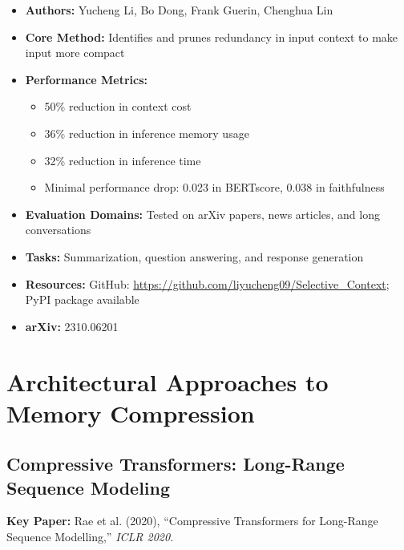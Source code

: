 \documentclass[11pt]{article}
\begin{document}
\begin{itemize}[leftmargin=*]
    \item \textbf{Authors:} Yucheng Li, Bo Dong, Frank Guerin, Chenghua Lin
    \item \textbf{Core Method:} Identifies and prunes redundancy in input context to make input more compact
    \item \textbf{Performance Metrics:}
    \begin{itemize}
        \item 50\% reduction in context cost
        \item 36\% reduction in inference memory usage
        \item 32\% reduction in inference time
        \item Minimal performance drop: 0.023 in BERTscore, 0.038 in faithfulness
    \end{itemize}
    \item \textbf{Evaluation Domains:} Tested on arXiv papers, news articles, and long conversations
    \item \textbf{Tasks:} Summarization, question answering, and response generation
    \item \textbf{Resources:} GitHub: \url{https://github.com/liyucheng09/Selective\_Context}; PyPI package available
    \item \textbf{arXiv:} 2310.06201
\end{itemize}

\section{Architectural Approaches to Memory Compression}

\subsection{Compressive Transformers: Long-Range Sequence Modeling}

\textbf{Key Paper:} Rae et al. (2020), ``Compressive Transformers for Long-Range Sequence Modelling,'' \textit{ICLR 2020}.
\end{document}
